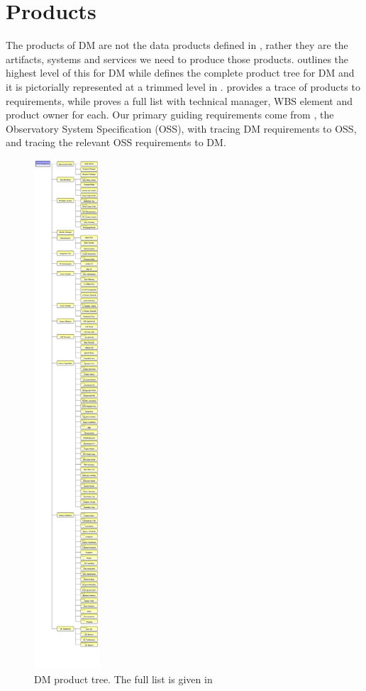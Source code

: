\section{Products \label{sect:products}}

The products of DM are not the data products defined in , rather they are the artifacts, systems and services  we need to produce those products.  outlines the highest level of this for DM while    defines the complete product tree for DM and it is pictorially represented at a trimmed level in  .
 provides a trace of products to requirements, while  proves a full list with technical manager, WBS element and product owner for each.
Our primary guiding requirements come from , the Observatory System Specification (OSS), with  tracing DM requirements  to OSS, and  tracing the relevant OSS requirements to DM.

\begin{figure}[htbp]
	\begin{center}
		 \includegraphics[height=19cm]{ProductTree}
		 \caption{DM product tree. \label{fig:prods}
		 The full list is given in 
	 }

	 \end{center}
 \end{figure}

